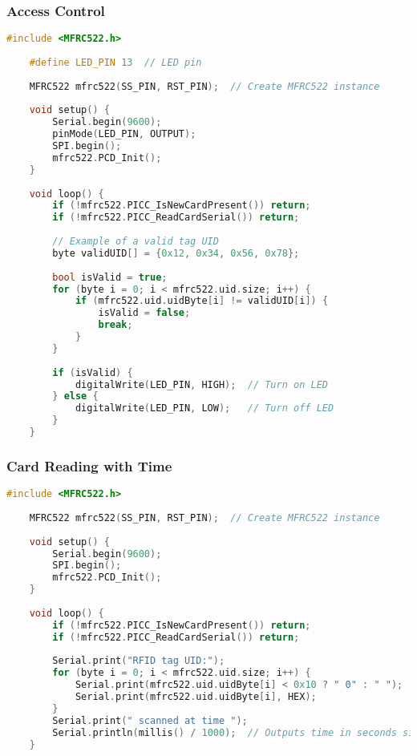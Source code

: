 \subsubsection*{Access Control}

\begin{lstlisting}[language=C++, caption=Access Control Solution]
	#include <MFRC522.h>
	
	#define LED_PIN 13  // LED pin
	
	MFRC522 mfrc522(SS_PIN, RST_PIN);  // Create MFRC522 instance
	
	void setup() {
		Serial.begin(9600);
		pinMode(LED_PIN, OUTPUT);
		SPI.begin();
		mfrc522.PCD_Init();
	}
	
	void loop() {
		if (!mfrc522.PICC_IsNewCardPresent()) return;
		if (!mfrc522.PICC_ReadCardSerial()) return;
		
		// Example of a valid tag UID
		byte validUID[] = {0x12, 0x34, 0x56, 0x78};
		
		bool isValid = true;
		for (byte i = 0; i < mfrc522.uid.size; i++) {
			if (mfrc522.uid.uidByte[i] != validUID[i]) {
				isValid = false;
				break;
			}
		}
		
		if (isValid) {
			digitalWrite(LED_PIN, HIGH);  // Turn on LED
		} else {
			digitalWrite(LED_PIN, LOW);   // Turn off LED
		}
	}
\end{lstlisting}

\clearpage
\subsubsection*{Card Reading with Time}

\begin{lstlisting}[language=C++, caption=Card Reading with Time Solution]
	#include <MFRC522.h>
	
	MFRC522 mfrc522(SS_PIN, RST_PIN);  // Create MFRC522 instance
	
	void setup() {
		Serial.begin(9600);
		SPI.begin();
		mfrc522.PCD_Init();
	}
	
	void loop() {
		if (!mfrc522.PICC_IsNewCardPresent()) return;
		if (!mfrc522.PICC_ReadCardSerial()) return;
		
		Serial.print("RFID tag UID:");
		for (byte i = 0; i < mfrc522.uid.size; i++) {
			Serial.print(mfrc522.uid.uidByte[i] < 0x10 ? " 0" : " ");
			Serial.print(mfrc522.uid.uidByte[i], HEX);
		}
		Serial.print(" scanned at time ");
		Serial.println(millis() / 1000);  // Outputs time in seconds since program started
	}
\end{lstlisting}

